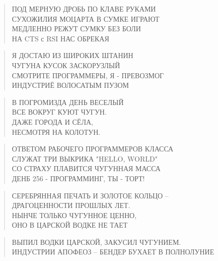 \poemtitle{***}
\begin{verse}
ПОД МЕРНУЮ ДРОБЬ ПО КЛАВЕ РУКАМИ\\
СУХОЖИЛИЯ МОЦАРТА В СУМКЕ ИГРАЮТ\\
МЕДЛЕННО РЕЖУТ СУМКУ БЕЗ БОЛИ\\
НА CTS с RSI НАС ОБРЕКАЯ
\end{verse}

\poemtitle{***}
\begin{verse}
Я ДОСТАЮ ИЗ ШИРОКИХ ШТАНИН\\
    ЧУГУНА КУСОК ЗАСКОРУЗЛЫЙ\\
СМОТРИТЕ ПРОГРАММЕРЫ, Я - ПРЕВОЗМОГ\\
    ИНДУСТРИЁ ВОЛОСАТЫМ ПУЗОМ
\end{verse}

\poemtitle{***}
\begin{verse}
В ПОГРОМИЗДА ДЕНЬ ВЕСЕЛЫЙ\\
ВСЕ ВОКРУГ КУЮТ ЧУГУН.\\
ДАЖЕ ГОРОДА И СЁЛА,\\
НЕСМОТРЯ НА КОЛОТУН.
\end{verse}

\poemtitle{***}
\begin{verse}
ОТВЕТОМ РАБОЧЕГО ПРОГРАММЕРОВ КЛАССА\\
СЛУЖАТ ТРИ ВЫКРИКА  "HELLO, WORLD"\\
СО СТРАХУ ПЛАВИТСЯ ЧУГУННАЯ МАССА\\
ДЕНБ 256 - ПРОГРАММИНГ, ТЫ - ТОРТ!
\end{verse}

\poemtitle{***}
\begin{verse}
СЕРЕБРЯННАЯ ПЕЧАТЬ И ЗОЛОТОЕ КОЛЬЦО --\\
ДРАГОЦЕННОСТИ ПРОШЛЫХ ЛЕТ.\\
НЫНЧЕ ТОЛЬКО ЧУГУННОЕ ЦЕННО,\\
ОНО В ЦАРСКОЙ ВОДКЕ НЕ ТАЕТ
\end{verse}

\poemtitle{***}
\begin{verse}
ВЫПИЛ ВОДКИ ЦАРСКОЙ, ЗАКУСИЛ ЧУГУНИЕМ.\\
ИНДУСТРИИ АПОФЕОЗ -- БЕНДЕР БУХАЕТ В ПОЛНОЛУНИЕ
\end{verse}

